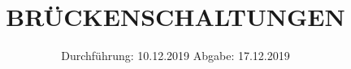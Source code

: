 

\subject{VERSUCH 302}
\title{BRÜCKENSCHALTUNGEN}
\date{%
  Durchführung: 10.12.2019
  \hspace{3em}
  Abgabe: 17.12.2019
}


\setlength{\parindent}{0pt} %

\maketitle
\thispagestyle{empty}
\tableofcontents
\newpage




%




\printbibliography{}


